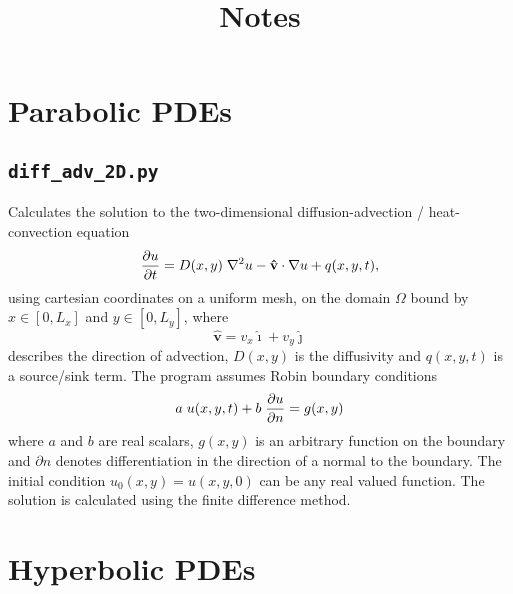 \documentclass{article}
\begin{document}
\title{Notes}

\section{Parabolic PDEs}

\subsection{\texttt{diff\_adv\_2D.py}} 

Calculates the solution to the two-dimensional diffusion-advection / heat-convection equation
\begin{equation*}
\frac{\partial u}{\partial t} = D(x,y) \hspace{0.1cm} \nabla^{2} u  - \mathbf{\hat{v}} \cdot \nabla u + q(x,y,t),
\end{equation*}
using cartesian coordinates on a uniform mesh, on the domain $\Omega$ bound by $x \in [0,L_x]$ and $y \in [0,L_y]$, where
\begin{equation*}
\mathbf{\hat{v}} = v_x \mathbf{\hat{\imath}} + v_y \mathbf{\hat{\jmath}}
\end{equation*}
describes the direction of advection, $D(x,y)$ is the diffusivity and $q(x,y,t)$ is a source/sink term. The program assumes Robin boundary conditions
\begin{equation*}
a \hspace{0.1cm} u(x,y,t) + b \hspace{0.1cm} \frac{\partial u}{\partial n} = g(x,y)
\end{equation*}
where $a$ and $b$ are real scalars, $g(x,y)$ is an arbitrary function on the boundary and $\partial n$ denotes differentiation in the direction of a normal to the boundary. The initial condition $u_0(x,y)=u(x,y,0)$ can be any real valued function. The solution is calculated using the finite difference method.

\section{Hyperbolic PDEs}
\end{document}
